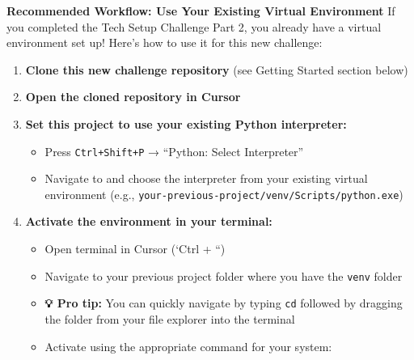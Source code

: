 \documentclass[
]{article}
\providecommand{\tightlist}{%
  \setlength{\itemsep}{0pt}\setlength{\parskip}{0pt}}
\begin{document}
\begin{tcolorbox}[enhanced jigsaw, colbacktitle=quarto-callout-important-color!10!white, toptitle=1mm, colframe=quarto-callout-important-color-frame, bottomtitle=1mm, colback=white, left=2mm, breakable, coltitle=black, bottomrule=.15mm, rightrule=.15mm, titlerule=0mm, opacityback=0, title=\textcolor{quarto-callout-important-color}{\faExclamation}\hspace{0.5em}{🎯 Note on Python Usage}, arc=.35mm, opacitybacktitle=0.6, toprule=.15mm, leftrule=.75mm]

\textbf{Recommended Workflow: Use Your Existing Virtual Environment} If
you completed the Tech Setup Challenge Part 2, you already have a
virtual environment set up! Here's how to use it for this new challenge:

\begin{enumerate}
\def\labelenumi{\arabic{enumi}.}
\tightlist
\item
  \textbf{Clone this new challenge repository} (see Getting Started
  section below)
\item
  \textbf{Open the cloned repository in Cursor}
\item
  \textbf{Set this project to use your existing Python interpreter:}

  \begin{itemize}
  \tightlist
  \item
    Press \texttt{Ctrl+Shift+P} → ``Python: Select Interpreter''
  \item
    Navigate to and choose the interpreter from your existing virtual
    environment (e.g.,
    \texttt{your-previous-project/venv/Scripts/python.exe})
  \end{itemize}
\item
  \textbf{Activate the environment in your terminal:}

  \begin{itemize}
  \tightlist
  \item
    Open terminal in Cursor (`Ctrl + ``)
  \item
    Navigate to your previous project folder where you have the
    \texttt{venv} folder
  \item
    \textbf{💡 Pro tip:} You can quickly navigate by typing \texttt{cd}
    followed by dragging the folder from your file explorer into the
    terminal
  \item
    Activate using the appropriate command for your system:


\end{itemize}
\end{enumerate}
\end{tcolorbox}
\end{document}
